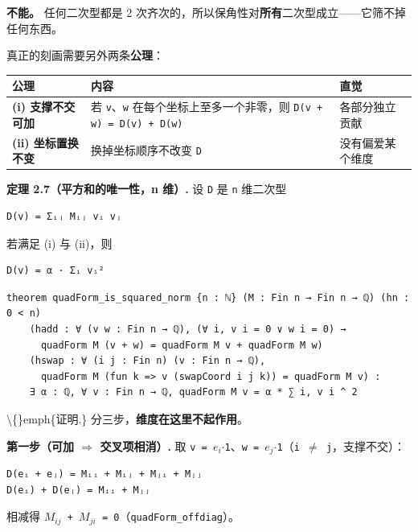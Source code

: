 \documentclass[11pt,a4paper]{ctexart}
\begin{document}
\textbf{不能。} 任何二次型都是 2 次齐次的，所以保角性对\textbf{所有}二次型成立——它筛不掉任何东西。

真正的刻画需要另外两条\textbf{公理}：

\begin{center}\small
\begin{tabular}{lll}
\toprule
公理 & 内容 & 直觉 \\
\midrule
\textbf{(i) 支撑不交可加} & 若 \texttt{v}、\texttt{w} 在每个坐标上至多一个非零，则 \texttt{D(v + w) = D(v) + D(w)} & 各部分独立贡献 \\
\textbf{(ii) 坐标置换不变} & 换掉坐标顺序不改变 \texttt{D} & 没有偏爱某个维度 \\
\bottomrule
\end{tabular}
\end{center}

\textbf{定理 2.7（平方和的唯一性，n 维）.} 设 \texttt{D} 是 \texttt{n} 维二次型

\begin{lstlisting}
D(v) = Σᵢⱼ Mᵢⱼ vᵢ vⱼ
\end{lstlisting}

若满足 (i) 与 (ii)，则

\begin{lstlisting}
D(v) = α · Σᵢ vᵢ²
\end{lstlisting}

\begin{lstlisting}
theorem quadForm_is_squared_norm {n : ℕ} (M : Fin n → Fin n → ℚ) (hn : 0 < n)
    (hadd : ∀ (v w : Fin n → ℚ), (∀ i, v i = 0 ∨ w i = 0) →
      quadForm M (v + w) = quadForm M v + quadForm M w)
    (hswap : ∀ (i j : Fin n) (v : Fin n → ℚ),
      quadForm M (fun k => v (swapCoord i j k)) = quadForm M v) :
    ∃ α : ℚ, ∀ v : Fin n → ℚ, quadForm M v = α * ∑ i, v i ^ 2
\end{lstlisting}

\textbackslash\{\}emph\{证明.\} 分三步，\textbf{维度在这里不起作用}。

\textbf{第一步（可加 \ensuremath{\Longrightarrow} 交叉项相消）.} 取 \texttt{v = \ensuremath{e_{i}}\ensuremath{\cdot}1}、\texttt{w = \ensuremath{e_{j}}\ensuremath{\cdot}1}（\texttt{i \ensuremath{\ne} j}，支撑不交）：

\begin{lstlisting}
D(eᵢ + eⱼ) = Mᵢᵢ + Mᵢⱼ + Mⱼᵢ + Mⱼⱼ
D(eᵢ) + D(eⱼ) = Mᵢᵢ + Mⱼⱼ
\end{lstlisting}

相减得 \texttt{\ensuremath{M_{ij}} + \ensuremath{M_{ji}} = 0}（\texttt{quadForm\_offdiag}）。
\end{document}
